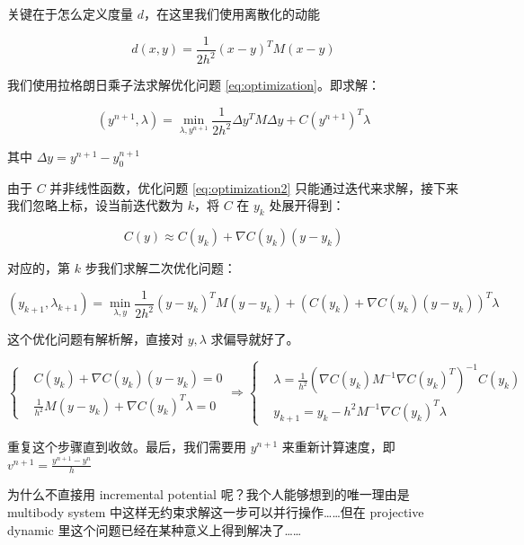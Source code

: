\documentclass{notes}
\begin{document}
关键在于怎么定义度量 $d$，在这里我们使用离散化的动能

\begin{equation}
	d(x, y) = \frac{1}{2h^2} (x - y)^T M (x - y)
\end{equation}

我们使用拉格朗日乘子法求解优化问题 \ref{eq:optimization}。即求解：

\begin{equation}\label{eq:optimization2}
	(y^{n + 1}, \lambda) = \min_{\lambda, y^{n + 1}}\frac{1}{2h^2} \Delta y^T M \Delta y + C(y^{n + 1})^T \lambda
\end{equation}

其中 $\Delta y = y^{n + 1} - y^{n + 1}_0$

由于 $C$ 并非线性函数，优化问题 \ref{eq:optimization2} 只能通过迭代来求解，接下来我们忽略上标，设当前迭代数为 $k$，将 $C$ 在 $y_k$ 处展开得到：

$$C(y) \approx C(y_k) + \nabla C(y_k)(y - y_k)$$

对应的，第 $k$ 步我们求解二次优化问题：

\begin{equation}\label{eq:quadraticopt}
	(y_{k + 1}, \lambda_{k + 1}) = \min_{\lambda, y} \frac{1}{2h^2} (y - y_k)^T M (y - y_k) + (C(y_k) + \nabla C(y_k)(y - y_k))^T \lambda
\end{equation}

这个优化问题有解析解，直接对 $y, \lambda$ 求偏导就好了。

\begin{equation}
	\left\{\begin{aligned}
		&C(y_k) + \nabla C(y_k)(y - y_k) = 0 \\
		&\frac{1}{h^2} M(y - y_k) + \nabla C(y_k)^T \lambda = 0
	\end{aligned}\right.
	\Rightarrow
	\left\{\begin{aligned}
	&\lambda = \frac{1}{h^2} (\nabla C(y_k) M ^{-1} \nabla C(y_k)^T) ^{-1} C(y_k) \\
	&y_{k + 1} = y_k - h^2 M ^{-1} \nabla C(y_k)^T \lambda
	\end{aligned}\right.
\end{equation}

重复这个步骤直到收敛。最后，我们需要用 $y^{n + 1}$ 来重新计算速度，即 $v^{n + 1} = \frac{y^{n+1} - y^n}{h}$

\begin{remark}
	为什么不直接用 incremental potential 呢？我个人能够想到的唯一理由是 multibody system 中这样无约束求解这一步可以并行操作……但在 projective dynamic 里这个问题已经在某种意义上得到解决了……
\end{remark}
\end{document}
